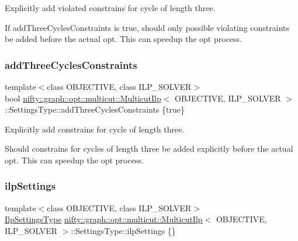 Explicitly add violated constrains for cycle of length three. 

If add\+Three\+Cycles\+Constraints is true, should only possible violating constraints be added before the actual opt. This can speedup the opt process. \mbox{\label{structnifty_1_1graph_1_1opt_1_1multicut_1_1MulticutIlp_1_1SettingsType_a4a91caa517c62ba5098317f4ac8702c8}} 
\subsubsection{\texorpdfstring{add\+Three\+Cycles\+Constraints}{addThreeCyclesConstraints}}
{\footnotesize\ttfamily template$<$class O\+B\+J\+E\+C\+T\+I\+VE, class I\+L\+P\+\_\+\+S\+O\+L\+V\+ER$>$ \\
bool \hyperlink{classnifty_1_1graph_1_1opt_1_1multicut_1_1MulticutIlp}{nifty\+::graph\+::opt\+::multicut\+::\+Multicut\+Ilp}$<$ O\+B\+J\+E\+C\+T\+I\+VE, I\+L\+P\+\_\+\+S\+O\+L\+V\+ER $>$\+::Settings\+Type\+::add\+Three\+Cycles\+Constraints \{true\}}



Explicitly add constrains for cycle of length three. 

Should constrains for cycles of length three be added explicitly before the actual opt. This can speedup the opt process. \mbox{\label{structnifty_1_1graph_1_1opt_1_1multicut_1_1MulticutIlp_1_1SettingsType_a02f867e50e587e0a1d74b93a34bd94b8}} 
\subsubsection{\texorpdfstring{ilp\+Settings}{ilpSettings}}
{\footnotesize\ttfamily template$<$class O\+B\+J\+E\+C\+T\+I\+VE, class I\+L\+P\+\_\+\+S\+O\+L\+V\+ER$>$ \\
\hyperlink{classnifty_1_1graph_1_1opt_1_1multicut_1_1MulticutIlp_ad46bf56538766a3bbf4d5783727e1e7c}{Ilp\+Settings\+Type} \hyperlink{classnifty_1_1graph_1_1opt_1_1multicut_1_1MulticutIlp}{nifty\+::graph\+::opt\+::multicut\+::\+Multicut\+Ilp}$<$ O\+B\+J\+E\+C\+T\+I\+VE, I\+L\+P\+\_\+\+S\+O\+L\+V\+ER $>$\+::Settings\+Type\+::ilp\+Settings \{\}}



